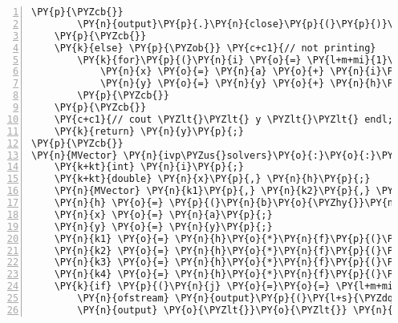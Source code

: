 \begin{Verbatim}[tabsize=2,commandchars=\\\{\},numbers=left,firstnumber=1,stepnumber=1]
		\PY{p}{\PYZcb{}}
		\PY{n}{output}\PY{p}{.}\PY{n}{close}\PY{p}{(}\PY{p}{)}\PY{p}{;}
	\PY{p}{\PYZcb{}}
	\PY{k}{else} \PY{p}{\PYZob{}} \PY{c+c1}{// not printing}
		\PY{k}{for}\PY{p}{(}\PY{n}{i} \PY{o}{=} \PY{l+m+mi}{1}\PY{p}{;} \PY{n}{i} \PY{o}{\PYZlt{}} \PY{n}{steps}\PY{o}{+}\PY{l+m+mi}{1}\PY{p}{;} \PY{n}{i}\PY{o}{+}\PY{o}{+}\PY{p}{)}\PY{p}{\PYZob{}}
			\PY{n}{x} \PY{o}{=} \PY{n}{a} \PY{o}{+} \PY{n}{i}\PY{o}{*}\PY{n}{h}\PY{p}{;}
			\PY{n}{y} \PY{o}{=} \PY{n}{y} \PY{o}{+} \PY{n}{h}\PY{o}{*}\PY{n}{f}\PY{p}{(}\PY{n}{x} \PY{o}{+} \PY{l+m+mf}{0.5}\PY{o}{*}\PY{n}{h}\PY{p}{,} \PY{n}{y} \PY{o}{+} \PY{l+m+mf}{0.5}\PY{o}{*}\PY{n}{h}\PY{o}{*}\PY{n}{f}\PY{p}{(}\PY{n}{x}\PY{p}{,}\PY{n}{y}\PY{p}{)}\PY{p}{)}\PY{p}{;}
		\PY{p}{\PYZcb{}}
	\PY{p}{\PYZcb{}}
	\PY{c+c1}{// cout \PYZlt{}\PYZlt{} y \PYZlt{}\PYZlt{} endl; // optional print}
	\PY{k}{return} \PY{n}{y}\PY{p}{;}
\PY{p}{\PYZcb{}}
\PY{n}{MVector} \PY{n}{ivp\PYZus{}solvers}\PY{o}{:}\PY{o}{:}\PY{n}{runge}\PY{p}{(}\PY{n}{MVector} \PY{o}{\PYZam{}}\PY{n}{y}\PY{p}{,} \PY{n}{MFunction} \PY{o}{\PYZam{}}\PY{n}{f}\PY{p}{,} \PY{k+kt}{int} \PY{n}{j}\PY{p}{)}\PY{p}{\PYZob{}}
	\PY{k+kt}{int} \PY{n}{i}\PY{p}{;}
	\PY{k+kt}{double} \PY{n}{x}\PY{p}{,} \PY{n}{h}\PY{p}{;}
	\PY{n}{MVector} \PY{n}{k1}\PY{p}{,} \PY{n}{k2}\PY{p}{,} \PY{n}{k3}\PY{p}{,} \PY{n}{k4}\PY{p}{;}
	\PY{n}{h} \PY{o}{=} \PY{p}{(}\PY{n}{b}\PY{o}{\PYZhy{}}\PY{n}{a}\PY{p}{)}\PY{o}{/}\PY{n}{steps}\PY{p}{;}
	\PY{n}{x} \PY{o}{=} \PY{n}{a}\PY{p}{;}
	\PY{n}{y} \PY{o}{=} \PY{n}{y}\PY{p}{;}
	\PY{n}{k1} \PY{o}{=} \PY{n}{h}\PY{o}{*}\PY{n}{f}\PY{p}{(}\PY{n}{x}\PY{p}{,}\PY{n}{y}\PY{p}{)}\PY{p}{;}
	\PY{n}{k2} \PY{o}{=} \PY{n}{h}\PY{o}{*}\PY{n}{f}\PY{p}{(}\PY{n}{x} \PY{o}{+} \PY{l+m+mf}{0.5}\PY{o}{*}\PY{n}{h}\PY{p}{,} \PY{n}{y} \PY{o}{+} \PY{l+m+mf}{0.5}\PY{o}{*}\PY{n}{k1}\PY{p}{)}\PY{p}{;}
	\PY{n}{k3} \PY{o}{=} \PY{n}{h}\PY{o}{*}\PY{n}{f}\PY{p}{(}\PY{n}{x} \PY{o}{+} \PY{l+m+mf}{0.5}\PY{o}{*}\PY{n}{h}\PY{p}{,} \PY{n}{y} \PY{o}{+} \PY{l+m+mf}{0.5}\PY{o}{*}\PY{n}{k2}\PY{p}{)}\PY{p}{;}
	\PY{n}{k4} \PY{o}{=} \PY{n}{h}\PY{o}{*}\PY{n}{f}\PY{p}{(}\PY{n}{x} \PY{o}{+} \PY{n}{h}\PY{p}{,} \PY{n}{y} \PY{o}{+} \PY{n}{k3}\PY{p}{)}\PY{p}{;}
	\PY{k}{if} \PY{p}{(}\PY{n}{j} \PY{o}{=}\PY{o}{=} \PY{l+m+mi}{1}\PY{p}{)}\PY{p}{\PYZob{}}
		\PY{n}{ofstream} \PY{n}{output}\PY{p}{(}\PY{l+s}{\PYZdq{}}\PY{l+s}{output\PYZus{}runge.csv}\PY{l+s}{\PYZdq{}}\PY{p}{)}\PY{p}{;}
		\PY{n}{output} \PY{o}{\PYZlt{}}\PY{o}{\PYZlt{}} \PY{n}{x} \PY{o}{\PYZlt{}}\PY{o}{\PYZlt{}} \PY{l+s}{\PYZdq{}}\PY{l+s}{,}\PY{l+s}{\PYZdq{}} \PY{o}{\PYZlt{}}\PY{o}{\PYZlt{}} \PY{n}{y}\PY{p}{[}\PY{l+m+mi}{0}\PY{p}{]} \PY{o}{\PYZlt{}}\PY{o}{\PYZlt{}} \PY{l+s}{\PYZdq{}}\PY{l+s}{,}\PY{l+s}{\PYZdq{}} \PY{o}{\PYZlt{}}\PY{o}{\PYZlt{}} \PY{n}{endl}\PY{p}{;} \PY{c+c1}{//\PYZlt{}\PYZlt{} y[1] \PYZlt{}\PYZlt{} endl;}

\end{Verbatim}
